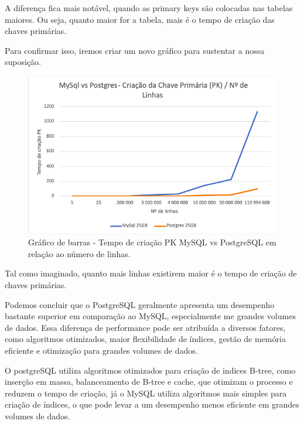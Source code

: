 \documentclass{article}
\begin{document}
A diferença fica mais notável, quando as primary keys são colocadas nas tabelas maiores. Ou seja, quanto maior for a tabela, mais é o tempo de criação das chaves primárias.

Para confirmar isso, iremos criar um novo gráfico para sustentar a nossa suposição.

\begin{figure}[H]
  \centering
  \includegraphics[width=\textwidth]{Graphs/linesvspk.png}
  \caption{Gráfico de barras - Tempo de criação PK MySQL vs PostgreSQL em relação ao número de linhas.}
  \label{fig:PKCreation2}
\end{figure}

\texttt{}\par Tal como imaginado, quanto mais linhas existirem maior é o tempo de criação de chaves primárias. \\
\texttt{}\par Podemos concluir que o PostgreSQL geralmente apresenta um desempenho bastante superior em comparação ao MySQL, especialmente me grandes volumes de dados. Essa diferença de performance pode ser atribuída a diversos fatores, como algoritmos otimizados, maior flexibilidade de índices, gestão de memória eficiente e otimização para grandes volumes de dados.\\

\texttt{}\par O postgreSQL utiliza algoritmos otimizados para criação de indices B-tree, como inserção em massa, balanceamento de B-tree e cache, que otimizam o processo e reduzem o tempo de criação, já o MySQL utiliza algoritmos mais simples para criação de índices, o que pode levar a um desempenho menos eficiente em grandes volumes de dados.\\
\end{document}
